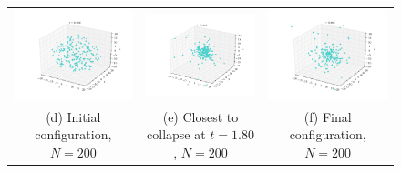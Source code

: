\documentclass{article}
\begin{document}
\begin{multicols}{2}
\begin{figure}
\begin{center}
\begin{tabular}{ccc}
	\includegraphics[width=60mm]{Images/Image_200_0000.png}
	& \includegraphics[width=60mm]{Images/Image_200_1800.png}
	& \includegraphics[width=60mm]{Images/Image_200_4995.png} \\
	(d) Initial configuration, $N = 200$					& (e) Closest to collapse at $t = 1.80$, $N = 200$	 	& (f) Final configuration, $N = 200$	 \\[6pt]
	

\end{tabular}
\end{center}
\end{figure}
\end{multicols}
\end{document}
